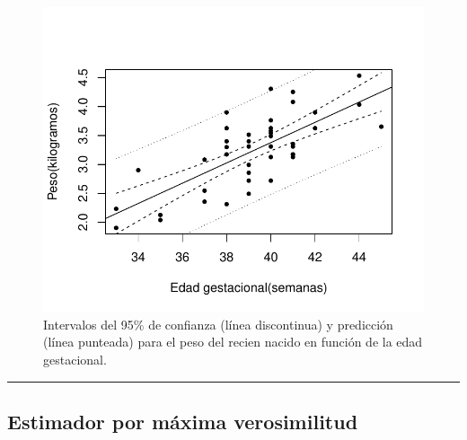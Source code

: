 \documentclass[
]{article}
\begin{document}
\begin{figure}

{\centering \includegraphics{MLG1_files/figure-latex/birthweightIC-1} 

}

\caption{\label{fig:BWdata2} Intervalos del 95\% de confianza (línea discontinua) y predicción (línea punteada) para el peso del recien nacido en función de la edad gestacional.}\label{fig:birthweightIC}
\end{figure}
\rule{\textwidth}{0.4pt}

\hypertarget{estimador-por-muxe1xima-verosimilitud}{%
\subsection{Estimador por máxima verosimilitud}\label{estimador-por-muxe1xima-verosimilitud}}
\end{document}
